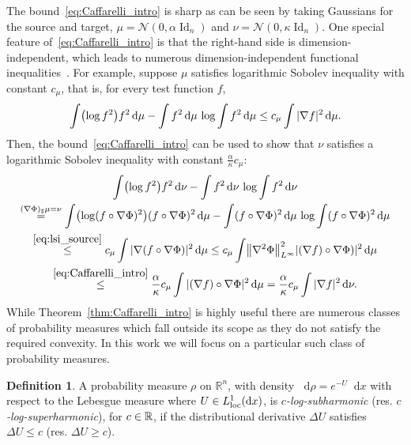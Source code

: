 \documentclass[10pt]{amsart}
\theoremstyle{definition}\newtheorem{defi}[theo]{Definition}\newtheorem{rema}[theo]{Remark}\newtheorem{exam}[theo]{Example}\newtheorem{exem}[theo]{Example}\newtheorem{nota}[theo]{Notation}
\newcommand{\R}{\mathbb R}
\DeclareMathOperator{\Id}{Id}
\DeclareMathOperator{\locc}{loc}
\newcommand{\dd}{n}
\newcommand{\conv}{c}
\newcommand{\prob}{\rho}
\newcommand{\source}{\mu}
\newcommand{\target}{\nu}
\newcommand{\lsh}{\alpha}
\newcommand{\lc}{\kappa}
\newcommand*\diff{\mathop{}\!\mathrm{d}}
\newcommand{\clN}{\mathcal{N}}
\newcommand{\OT}{\Phi}
\let\originalleft\left
\let\originalright\right
\renewcommand{\left}{\mathopen{}\mathclose\bgroup\originalleft}
\renewcommand{\right}{\aftergroup\egroup\originalright}
\let\oldin\in
\renewcommand{\in}{\mathchoice{\oldin}{\oldin}{\,\oldin\,}{\,\oldin\,}}
\begin{document}
The bound~\eqref{eq:Caffarelli_intro} is sharp as can be seen by taking Gaussians for the source and target, $\source=\clN(0,\lsh\Id_{\dd})$ and $\target=\clN(0,\lc\Id_{\dd})$. One special feature of~\eqref{eq:Caffarelli_intro} is that the right-hand side is dimension-independent, which leads to numerous dimension-independent functional inequalities~\cite{cordero2002some,cordero2004b,harge2004convex,klartag2007marginals}. For example, suppose $\source$ satisfies logarithmic Sobolev inequality with constant $c_{\source}$, that is, for every test function $f$,
\begin{equation}\label{eq:lsi_source}
\int \left(\log f^2\right)f^2\diff \source-\int f^2\diff \source\,\log\int f^2\diff \source\le c_{\source}\int |\nabla f|^2\diff \source.
\end{equation}
Then, the bound~\eqref{eq:Caffarelli_intro} can be used to show that $\target$ satisfies a logarithmic Sobolev inequality with constant $\frac{\lsh}{\lc}c_{\source}$:
\begin{multline}\label{eq:Lip-func_ineq}
\int \left(\log f^2\right)f^2\diff \target-\int f^2\diff \target\,\log\int f^2\diff \target\\
\overset{(\nabla \OT)_{\sharp}\source=\target}{=}\int \left(\log (f\circ \nabla\OT)^2\right)(f\circ \nabla \OT)^2\diff \source
-\int (f\circ \nabla\OT)^2\diff \source\,\log\int (f\circ\nabla \OT)^2\diff \source\\
\overset{\eqref{eq:lsi_source}}{\le} c_{\source}\int |\nabla (f\circ \nabla\OT)|^2\diff \source
\le c_{\source}\int \left\|\nabla^2\OT\right\|_{L^{\infty}}^2|(\nabla f)\circ \nabla\OT)|^2\diff \source\\
\overset{\eqref{eq:Caffarelli_intro}}{\le}\frac{\lsh}{\lc}c_{\source}\int |(\nabla f)\circ \nabla\OT|^2\diff \source=\frac{\lsh}{\lc}c_{\source}\int |\nabla f|^2\diff \target.
\end{multline}
While Theorem~\ref{thm:Caffarelli_intro} is highly useful there are numerous classes of probability measures which fall outside its scope as they do not satisfy the required convexity. In this work we will focus on a particular such class of probability measures.
\begin{defi}\label{def:log_subharmonic}
A probability measure $\prob$ on $\R^{\dd}$, with density $\diff \prob=e^{-U}\diff x$ with respect to the Lebesgue measure where $U\in L_{\locc}^1(\diff x)$, is \emph{$\conv$-log-subharmonic} (res. \emph{$\conv$-log-superharmonic}), for $\conv\in \R$, if the distributional derivative $\Delta U$ satisfies $\Delta U \le\conv $ (res. $\Delta U \ge \conv$).
\end{defi}
\end{document}

